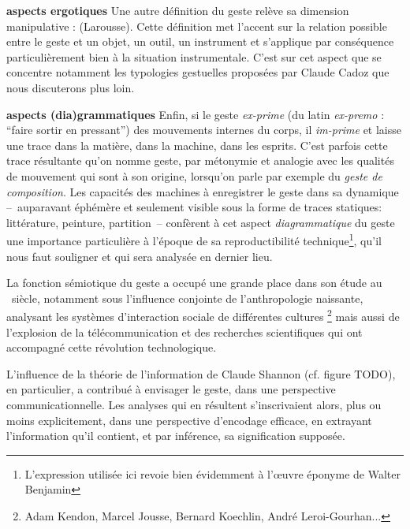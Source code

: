 \noindent \textbf{aspects ergotiques} Une autre définition du geste relève sa dimension manipulative :  (Larousse). Cette définition met l'accent sur la relation possible entre le geste et un objet, un outil, un instrument et s'applique par conséquence particulièrement bien à la situation instrumentale. C'est sur cet aspect que se concentre notamment les typologies gestuelles proposées par Claude Cadoz que nous discuterons plus loin.

\noindent \textbf{aspects (dia)grammatiques} Enfin, si le geste \textit{ex-prime} (du latin \textit{ex-premo} : ``faire sortir en pressant'') des mouvements internes du corps, il \textit{im-prime} et laisse une trace dans la matière, dans la machine, dans les esprits. C'est parfois cette trace résultante qu'on nomme geste, par métonymie et analogie avec les qualités de mouvement qui sont à son origine, lorsqu'on parle par exemple du \textit{geste de composition}. Les capacités des machines à enregistrer le geste dans sa dynamique --~auparavant éphémère et seulement visible sous la forme de traces statiques: littérature, peinture, partition~-- confèrent à cet aspect \textit{diagrammatique} du geste une importance particulière à l'époque de sa reproductibilité technique\footnote{L'expression utilisée ici revoie bien évidemment à l'œuvre éponyme de Walter Benjamin\cite{benjamin_loeuvre_2013}}, qu'il nous faut souligner et qui sera analysée en dernier lieu.


La fonction sémiotique du geste a occupé une grande place dans son étude au ~siècle, notamment sous l'influence conjointe de l'anthropologie naissante, analysant les systèmes d'interaction sociale de différentes cultures \footnote{Adam Kendon, Marcel Jousse, Bernard Koechlin, André Leroi-Gourhan...} mais aussi de l'explosion de la télécommunication et des recherches scientifiques qui ont accompagné cette révolution technologique.

L'influence de la théorie de l'information de Claude Shannon (cf. figure TODO), en particulier, a contribué à envisager le geste, dans une perspective communicationnelle. Les analyses qui en résultent s'inscrivaient alors, plus ou moins explicitement, dans une perspective d'encodage efficace, en extrayant l'information qu'il contient, et par inférence, sa signification supposée.

